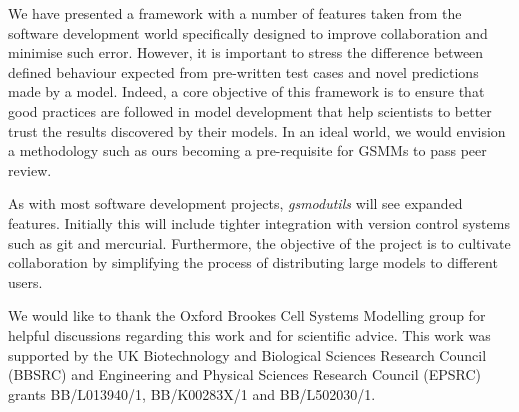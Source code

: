 \documentclass[journal=asbcd6]{achemso}
\begin{document}
We have presented a framework with a number of features taken from the software development world specifically designed to improve collaboration and minimise such error.
However, it is important to stress the difference between defined behaviour expected from pre-written test cases and novel predictions made by a model.
Indeed, a core objective of this framework is to ensure that good practices are followed in model development that help scientists to better trust the results discovered by their models.
In an ideal world, we would envision a methodology such as ours becoming a pre-requisite for GSMMs to pass peer review.

As with most software development projects, \textit{gsmodutils} will see expanded features.
Initially this will include tighter integration with version control systems such as git and mercurial.
Furthermore, the objective of the project is to cultivate collaboration by simplifying the process of distributing large models to different users.


\begin{acknowledgement}
We would like to thank the Oxford Brookes Cell Systems Modelling group for helpful discussions regarding this work and for scientific advice.
This work was supported by the UK Biotechnology and Biological Sciences Research Council (BBSRC) and Engineering and Physical Sciences Research Council (EPSRC) grants BB/L013940/1,  BB/K00283X/1 and BB/L502030/1.
\end{acknowledgement}


\end{document}
